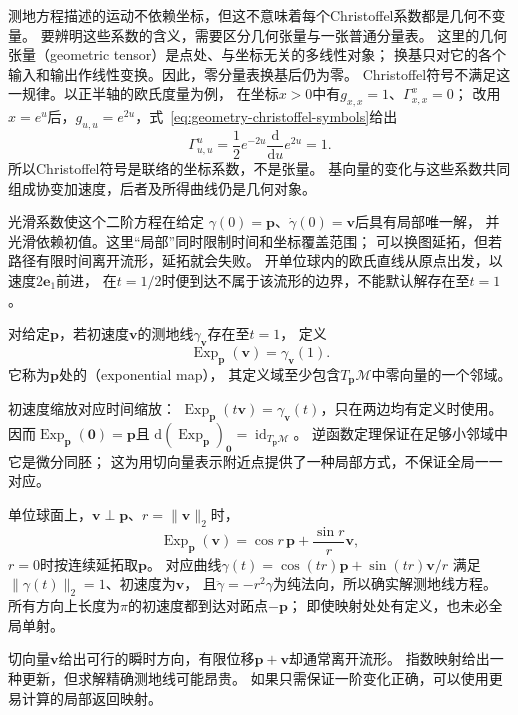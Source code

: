 测地方程描述的运动不依赖坐标，但这不意味着每个Christoffel系数都是几何不变量。
要辨明这些系数的含义，需要区分几何张量与一张普通分量表。
这里的几何张量（geometric tensor）是点处、与坐标无关的多线性对象；
换基只对它的各个输入和输出作线性变换。因此，零分量表换基后仍为零。
Christoffel符号不满足这一规律。以正半轴的欧氏度量为例，
在坐标$x>0$中有$g_{x,x}=1$、$\Gamma^x_{x,x}=0$；
改用$x=e^u$后，$g_{u,u}=e^{2u}$，式~\eqref{eq:geometry-christoffel-symbols}给出
\[
 \Gamma^u_{u,u}=\frac12 e^{-2u}\frac{\mathrm d}{\mathrm du}e^{2u}=1.
\]
所以Christoffel符号是联络的坐标系数，不是张量。
基向量的变化与这些系数共同组成协变加速度，后者及所得曲线仍是几何对象。

光滑系数使这个二阶方程在给定
$\gamma(0)=\bm p$、$\dot\gamma(0)=\bm v$后具有局部唯一解，
并光滑依赖初值。这里“局部”同时限制时间和坐标覆盖范围；
可以换图延拓，但若路径有限时间离开流形，延拓就会失败。
开单位球内的欧氏直线从原点出发，以速度$2\bm e_1$前进，
在$t=1/2$时便到达不属于该流形的边界，不能默认解存在至$t=1$。

\begin{definition}[指数映射]
\label{def:geometry-exponential-map}
对给定$\bm p$，若初速度$\bm v$的测地线$\gamma_{\bm v}$存在至$t=1$，
定义
\[
 \operatorname{Exp}_{\bm p}(\bm v)=\gamma_{\bm v}(1).
\]
它称为$\bm p$处的（exponential map），
其定义域至少包含$T_{\bm p}\mathcal M$中零向量的一个邻域。
\end{definition}
初速度缩放对应时间缩放：
$\operatorname{Exp}_{\bm p}(t\bm v)=\gamma_{\bm v}(t)$，只在两边均有定义时使用。
因而$\operatorname{Exp}_{\bm p}(\bm0)=\bm p$且
$\mathrm d(\operatorname{Exp}_{\bm p})_{\bm0}=\operatorname{id}_{T_{\bm p}\mathcal M}$。
逆函数定理保证在足够小邻域中它是微分同胚；
这为用切向量表示附近点提供了一种局部方式，不保证全局一一对应。

单位球面上，$\bm v\perp\bm p$、$r=\lVert\bm v\rVert_2$时，
\begin{equation}
 \operatorname{Exp}_{\bm p}(\bm v)
 =\cos r\,\bm p+\frac{\sin r}{r}\bm v,
 \label{eq:geometry-sphere-exponential}
\end{equation}
$r=0$时按连续延拓取$\bm p$。
对应曲线$\gamma(t)=\cos(tr)\bm p+\sin(tr)\bm v/r$
满足$\lVert\gamma(t)\rVert_2=1$、初速度为$\bm v$，
且$\ddot\gamma=-r^2\gamma$为纯法向，所以确实解测地线方程。
所有方向上长度为$\pi$的初速度都到达对跖点$-\bm p$；
即使映射处处有定义，也未必全局单射。


切向量$\bm v$给出可行的瞬时方向，有限位移$\bm p+\bm v$却通常离开流形。
指数映射给出一种更新，但求解精确测地线可能昂贵。
如果只需保证一阶变化正确，可以使用更易计算的局部返回映射。

